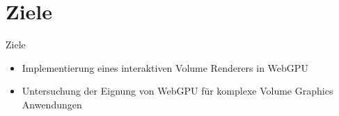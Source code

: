 \section{Ziele}
\begin{frame}{Ziele}
    \begin{itemize}
        \item Implementierung eines interaktiven Volume Renderers in WebGPU
        \item Untersuchung der Eignung von WebGPU für komplexe Volume Graphics Anwendungen
    \end{itemize}
\end{frame}